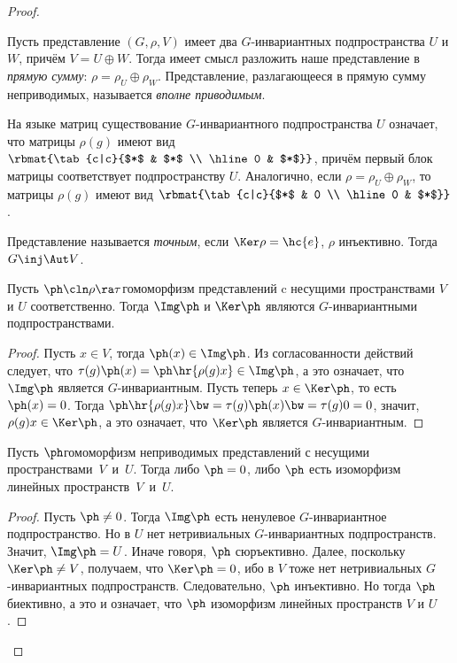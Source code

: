 \documentclass[a4paper]{article}
\newcommand{\kph}{\Ker \ph}
\begin{document}
\begin{proof}
\begin{df}
Пусть представление $(G, \rho, V)$ имеет два $G$-инвариантных подпространства $U$  и $W$, причём $V = U
\oplus W$. Тогда имеет смысл разложить наше представление в \emph{прямую сумму}: $\rho = \rho_U \oplus
\rho_W$. Представление, разлагающееся в прямую сумму неприводимых, называется \emph{вполне приводимым}.
\end{df}

На языке матриц существование $G$-инвариантного подпространства $U$ означает, что  матрицы $\rho(g)$ имеют
вид $\rbmat{\tab{c|c}{$*$ & $*$ \\ \hline 0 & $*$}}$, причём первый блок матрицы соответствует
подпространству $U$. Аналогично, если $\rho = \rho_U \oplus \rho_W$, то матрицы $\rho(g)$ имеют вид
$\rbmat{\tab{c|c}{$*$ & 0 \\ \hline 0 & $*$}}$.

\begin{df}
Представление называется \emph{точным}, если $\Ker \rho = \hc{e}$,  $\rho$  инъективно. Тогда $G \inj
\Aut V$.
\end{df}

\begin{theorem}
Пусть $\ph\cln \rho \ra \tau$\т гомоморфизм представлений c несущими пространствами  $V$ и $U$ соответственно.
Тогда $\Img \ph$ и $\kph$ являются $G$-инвариантными подпространствами.
\end{theorem}
\begin{proof}
Пусть $x \in V$, тогда $\ph(x) \in \Img \ph$. Из согласованности действий следует,  что
$\tau(g)\ph(x)=\ph\hr{\rho(g)x} \in \Img \ph$, а это означает, что $\Img \ph$ является $G$-инвариантным.
Пусть теперь $x\in \kph$, то есть $\ph(x) = 0$. Тогда $\ph\hr{\rho(g)x}\bw=\tau(g)\ph(x)\bw=\tau(g)0=0$, значит,
$\rho(g)x \in \kph$, а это означает, что $\kph$ является $G$-инвариантным.
\end{proof}

\begin{theorem}
Пусть $\ph$\т гомоморфизм неприводимых представлений с несущими пространствами~$V$~и~$U$.
Тогда либо $\ph = 0$, либо $\ph$ есть изоморфизм линейных пространств~$V$~и~$U$.
\end{theorem}
\begin{proof}
Пусть $\ph \neq 0$. Тогда $\Img \ph$ есть ненулевое $G$-инвариантное подпространство.  Но в $U$ нет
нетривиальных $G$-инвариантных подпространств. Значит, $\Img \ph = U$. Иначе говоря, $\ph$ сюръективно.
Далее, поскольку $\kph \neq V$, получаем, что $\kph = 0$, ибо в $V$ тоже нет нетривиальных $G$-инвариантных
подпространств. Следовательно, $\ph$ инъективно. Но тогда $\ph$ биективно, а это и означает, что $\ph$\т
изоморфизм линейных пространств $V$ и $U$.
\end{proof}


\end{proof}
\end{document}
